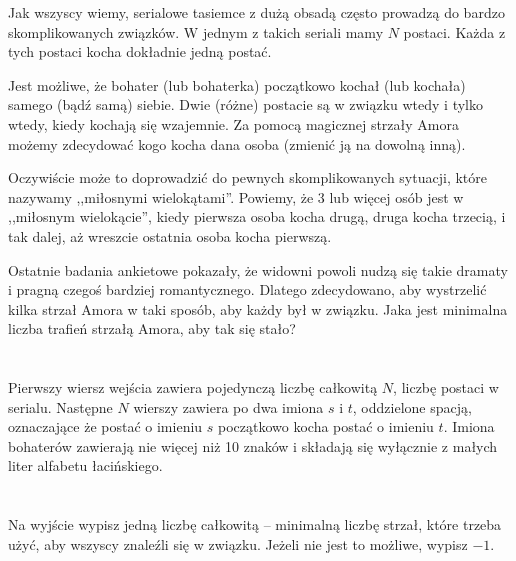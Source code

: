 \ifx\boi\undefined\fi
\def\version{jury-1}

Jak wszyscy wiemy, serialowe tasiemce z dużą obsadą często prowadzą do bardzo skomplikowanych związków.
W jednym z takich seriali mamy $N$ postaci. Każda z tych postaci kocha dokładnie jedną postać.

Jest możliwe, że bohater (lub bohaterka) początkowo kochał (lub kochała) samego (bądź samą) siebie.
Dwie (różne) postacie są w związku wtedy i tylko wtedy, kiedy kochają się wzajemnie.
Za pomocą magicznej strzały Amora możemy zdecydować kogo kocha dana osoba (zmienić ją na dowolną inną).

Oczywiście może to doprowadzić do pewnych skomplikowanych sytuacji, które nazywamy ,,miłosnymi wielokątami''.
Powiemy, że 3 lub więcej osób jest w ,,miłosnym wielokącie'', kiedy pierwsza osoba kocha drugą, druga kocha trzecią,
i tak dalej, aż wreszcie ostatnia osoba kocha pierwszą.

Ostatnie badania ankietowe pokazały, że widowni powoli nudzą się takie dramaty i pragną
czegoś bardziej romantycznego. Dlatego zdecydowano, aby wystrzelić kilka strzał Amora w taki sposób,
aby każdy był w związku. Jaka jest minimalna liczba trafień strzałą Amora, aby tak się stało?

\section*{}
Pierwszy wiersz wejścia zawiera pojedynczą liczbę całkowitą $N$, liczbę postaci w serialu.
Następne $N$ wierszy zawiera po dwa imiona $s$ i $t$, oddzielone spacją, oznaczające
że postać o imieniu $s$ początkowo kocha postać o imieniu $t$. Imiona bohaterów zawierają
nie więcej niż 10 znaków i składają się wyłącznie z małych liter alfabetu łacińskiego. %

\section*{\outputsection}
Na wyjście wypisz jedną liczbę całkowitą -- minimalną liczbę strzał, które trzeba użyć, aby wszyscy
znaleźli się w związku. Jeżeli nie jest to możliwe, wypisz $-1$.

\section*{\constraints}
\testgroups

